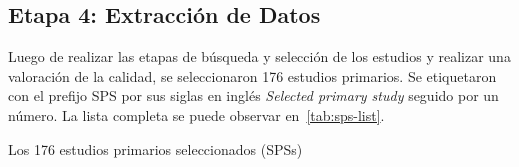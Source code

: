 \subsection{Etapa 4: Extracción de Datos}
Luego de realizar las etapas de búsqueda y selección de los estudios y realizar una valoración de la calidad, se seleccionaron 176 estudios primarios. Se etiquetaron con el prefijo SPS por sus siglas en inglés \textit{Selected primary study} seguido por un número. La lista completa se puede observar en~\ref{tab:sps-list}.

\begin{table*}[htbp]
\centering
\footnotesize
\caption{Los 176 estudios primarios seleccionados (SPSs)}\label{tab:sps-list}

\renewcommand{\arraystretch}{1.3} %


\end{table*}
